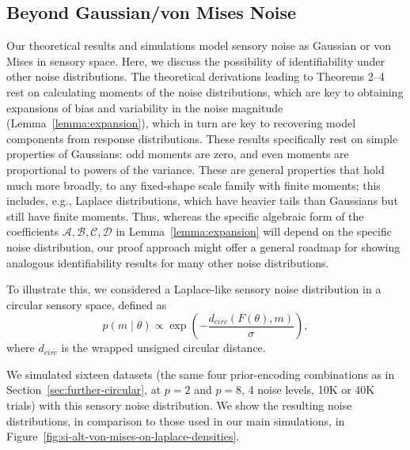 \documentclass[si.tex]{subfiles}
\begin{document}
\subsection{Beyond Gaussian/von Mises Noise}\label{sec:other-noise}
Our theoretical results and simulations model sensory noise as Gaussian or von Mises in sensory space.
Here, we discuss the possibility of identifiability under other noise distributions.
The theoretical derivations leading to Theorems 2--4 rest on calculating moments of the noise distributions, which are key to obtaining expansions of bias and variability in the noise magnitude (Lemma~\ref{lemma:expansion}), which in turn are key to recovering model components from response distributions.
These results specifically rest on simple properties of Gaussians: odd moments are zero, and even moments are proportional to powers of the variance.
These are general properties that hold much more broadly, to any fixed-shape scale family with finite moments; this includes, e.g., Laplace distributions, which have heavier tails than Gaussians but still have finite moments.
Thus, whereas the specific algebraic form of the coefficients $\mathcal{A}, \mathcal{B}, \mathcal{C}, \mathcal{D}$ in Lemma~\ref{lemma:expansion} will depend on the specific noise distribution, our proof approach might offer a general roadmap for showing analogous identifiability results for many other noise distributions.


To illustrate this, we considered a Laplace-like sensory noise distribution in a circular sensory space, defined as
\begin{equation}\label{eq:laplace-noise}
p(m\mid \theta) \propto \exp\left(-\frac{d_{circ}(F(\theta),m)}{\sigma}\right),
\end{equation}
where $d_{circ}$ is the wrapped unsigned circular distance.

We simulated sixteen datasets (the same four prior-encoding combinations as in Section~\ref{sec:further-circular}, at $p=2$ and $p=8$, 4 noise levels, 10K or 40K trials) with this sensory noise distribution.
We show the resulting noise distributions, in comparison to those used in our main simulations, in Figure~\ref{fig:si-alt-von-mises-on-laplace-densities}.
\end{document}
